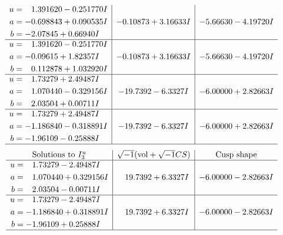 \documentclass[1p]{elsarticle_modified}
\theoremstyle{definition}
\newcommand{\I}{\sqrt{-1}}
\begin{document}
$$\begin{array}{c|c|c}
\begin{aligned}
u &= \phantom{-}1.391620 - 0.251770 I \\
a &= -0.698843 + 0.090535 I \\
b &= -2.07845 + 0.66940 I\end{aligned}
 & -0.10873 + 3.16633 I & -5.66630 - 4.19720 I \\ \hline\begin{aligned}
u &= \phantom{-}1.391620 - 0.251770 I \\
a &= -0.09615 + 1.82357 I \\
b &= \phantom{-}0.112878 + 1.032920 I\end{aligned}
 & -0.10873 + 3.16633 I & -5.66630 - 4.19720 I \\ \hline\begin{aligned}
u &= \phantom{-}1.73279 + 2.49487 I \\
a &= \phantom{-}1.070440 - 0.329156 I \\
b &= \phantom{-}2.03504 + 0.00711 I\end{aligned}
 & -19.7392 - 6.3327 I & -6.00000 + 2.82663 I \\ \hline\begin{aligned}
u &= \phantom{-}1.73279 + 2.49487 I \\
a &= -1.186840 - 0.318891 I \\
b &= -1.96109 - 0.25888 I\end{aligned}
 & -19.7392 - 6.3327 I & -6.00000 + 2.82663 I\\
 \hline 
 \end{array}$$\newpage$$\begin{array}{c|c|c}  
\text{Solutions to }I^u_{3}& \I (\text{vol} + \sqrt{-1}CS) & \text{Cusp shape}\\
 \hline 
\begin{aligned}
u &= \phantom{-}1.73279 - 2.49487 I \\
a &= \phantom{-}1.070440 + 0.329156 I \\
b &= \phantom{-}2.03504 - 0.00711 I\end{aligned}
 & \phantom{-}19.7392 + 6.3327 I & -6.00000 - 2.82663 I \\ \hline\begin{aligned}
u &= \phantom{-}1.73279 - 2.49487 I \\
a &= -1.186840 + 0.318891 I \\
b &= -1.96109 + 0.25888 I\end{aligned}
 & \phantom{-}19.7392 + 6.3327 I & -6.00000 - 2.82663 I\\
 \hline 
 \end{array}$$\newpage\newpage\renewcommand{\arraystretch}{1}
\end{document}
